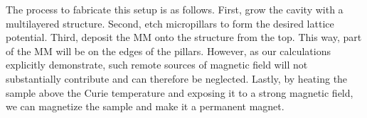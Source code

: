 The process to fabricate this setup is as follows. First, grow the cavity with a multilayered structure. Second, etch micropillars to form the desired lattice potential. Third, deposit the MM onto the structure from the top. This way, part of the MM will be on the edges of the pillars.
However, as our calculations explicitly demonstrate, such remote sources of magnetic field will not substantially contribute and can therefore be neglected.
Lastly, by heating the sample above the Curie temperature and exposing it to a strong magnetic field, we can magnetize the sample and make it a permanent magnet.


